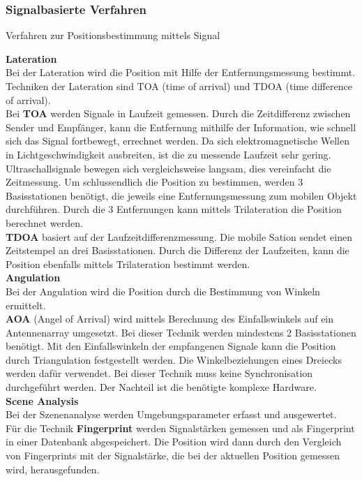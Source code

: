     \subsubsection{Signalbasierte Verfahren}

    Verfahren zur Positionsbestimmung mittels Signal \cite{pos_signal_2} \cite{pos_signal_4}
    
    \textbf{Lateration}\\
    Bei der Lateration wird die Position mit Hilfe der Entfernungsmessung bestimmt.
    Techniken der Lateration sind TOA (time of arrival) und TDOA (time difference of arrival).\\
    Bei \textbf{TOA} werden Signale in Laufzeit gemessen. Durch die Zeitdifferenz zwischen Sender und Empfänger, kann die Entfernung mithilfe der Information, wie schnell sich das Signal fortbewegt, errechnet werden. Da sich elektromagnetische Wellen in Lichtgeschwindigkeit ausbreiten, ist die zu messende Laufzeit sehr gering. Ultraschallsignale bewegen sich vergleichsweise langsam, dies vereinfacht die Zeitmessung. 
    Um schlussendlich die Position zu bestimmen, werden 3 Basisstationen benötigt, die jeweils eine Entfernungsmessung zum mobilen Objekt durchführen. Durch die 3 Entfernungen kann mittels Trilateration die Position berechnet werden.
    \\ %
    \textbf{TDOA} basiert auf der Laufzeitdifferenzmessung. 
    Die mobile Sation sendet einen Zeitstempel an drei Basisstationen. Durch die Differenz der Laufzeiten, kann die Position ebenfalls mittels Trilateration bestimmt werden.
    \\ %
    \textbf{Angulation}\\
    Bei der Angulation wird die Position durch die Bestimmung von Winkeln ermittelt. \\
    \textbf{AOA} (Angel of Arrival) wird mittels Berechnung des Einfallswinkels auf ein Antennenarray umgesetzt. Bei dieser Technik werden mindestens 2 Basisstationen benötigt. Mit den Einfallswinkeln der empfangenen Signale kann die Position durch Triangulation festgestellt werden. Die Winkelbeziehungen eines Dreiecks werden dafür verwendet.
    Bei dieser Technik muss keine Synchronisation durchgeführt werden. Der Nachteil ist die benötigte komplexe Hardware. 
    \\ %
    \textbf{Scene Analysis}\\
    Bei der Szenenanalyse werden Umgebungsparameter erfasst und ausgewertet.\\
    Für die Technik \textbf{Fingerprint} werden Signalstärken gemessen und als Fingerprint in einer Datenbank abgespeichert. Die Position wird dann durch den Vergleich von Fingerprints mit der Signalstärke, die bei der aktuellen Position gemessen wird, herausgefunden.
